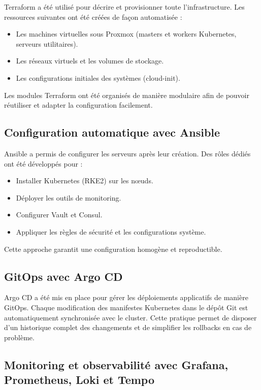 Terraform a été utilisé pour décrire et provisionner toute l'infrastructure. Les ressources suivantes ont été créées de façon automatisée :

\begin{itemize}
	\item Les machines virtuelles sous Proxmox (masters et workers Kubernetes, serveurs utilitaires).
	\item Les réseaux virtuels et les volumes de stockage.
	\item Les configurations initiales des systèmes (cloud-init).
\end{itemize}

Les modules Terraform ont été organisés de manière modulaire afin de pouvoir réutiliser et adapter la configuration facilement.

\subsection{Configuration automatique avec Ansible}

Ansible a permis de configurer les serveurs après leur création. Des rôles dédiés ont été développés pour :

\begin{itemize}
	\item Installer Kubernetes (RKE2) sur les nœuds.
	\item Déployer les outils de monitoring.
	\item Configurer Vault et Consul.
	\item Appliquer les règles de sécurité et les configurations système.
\end{itemize}

Cette approche garantit une configuration homogène et reproductible.

\subsection{GitOps avec Argo CD}

Argo CD a été mis en place pour gérer les déploiements applicatifs de manière GitOps. Chaque modification des manifestes Kubernetes dans le dépôt Git est automatiquement synchronisée avec le cluster. Cette pratique permet de disposer d’un historique complet des changements et de simplifier les rollbacks en cas de problème.

\subsection{Monitoring et observabilité avec Grafana, Prometheus, Loki et Tempo}

